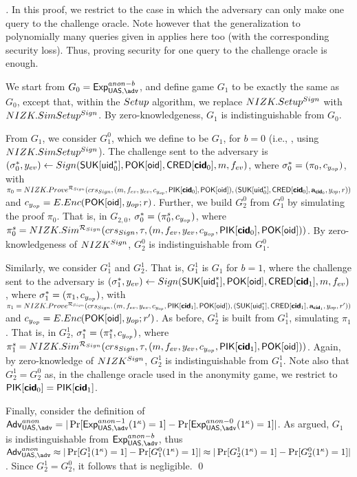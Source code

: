 \begin{proof}[]
  In this proof, we restrict to the case in which the adversary can only make
  one query to the challenge oracle. Note however that the generalization to
  polynomially many queries given in \cite{bsz05} applies here too (with the
  corresponding security loss). Thus, proving security for one query to the
  challenge oracle is enough.

  We start from $G_0=\ExpAnonb$, and define game $G_1$ to be exactly the same
  as $G_0$, except that, within the $Setup$ algorithm, we replace
  $NIZK.Setup^{Sign}$ with $NIZK.SimSetup^{Sign}$. By zero-knowledgeness,
  $G_1$ is indistinguishable from $G_0$.
  
  From $G_1$, we consider $G^0_1$, which we define to be $G_1$, for $b=0$
  (i.e., \ExpAnonz, using $NIZK.SimSetup^{Sign}$). The challenge sent to the
  adversary is $(\mathsf{\sigma}^*_0,y_{ev}) \gets Sign(\mathsf{S}\mathsf{UK}[\mathsf{uid}^*_0],\mathsf{P}\mathsf{OK}[\mathsf{oid}],
  \mathsf{CRED}[\boldsymbol{\mathsf{cid}}_0],m,f_{ev})$, where $\mathsf{\sigma}^*_0 = (\pi_0,c_{y_{op}})$, with
  $\pi_0 = NIZK.Prove^{\mathcal{R}_{Sign}}(crs_{Sign},(m,f_{ev},y_{ev},
  c_{y_{op}},\mathsf{P}\mathsf{IK}[\boldsymbol{\mathsf{cid}}_0],\mathsf{P}\mathsf{OK}[\mathsf{oid}]),(\mathsf{S}\mathsf{UK}[\mathsf{uid}^*_0],
  \mathsf{CRED}[\boldsymbol{\mathsf{cid}}_0],\mathbf{a}_{\boldsymbol{\mathsf{cid}}_0},y_{op},r))$ and $c_{y_{op}} =
  E.Enc(\mathsf{P}\mathsf{OK}[\mathsf{oid}],y_{op};r)$.
  Further, we build $G_2^0$ from $G_1^0$ by simulating the proof $\pi_0$. That
  is, in $G_{2,0}$, $\mathsf{\sigma}^*_0 = (\pi_0^s,c_{y_{op}})$, where $\pi^s_0 =
  NIZK.Sim^{\mathcal{R}_{Sign}}(crs_{Sign},\tau,(m,f_{ev},y_{ev},
  c_{y_{op}},\mathsf{P}\mathsf{IK}[\boldsymbol{\mathsf{cid}}_0],\mathsf{P}\mathsf{OK}[\mathsf{oid}]))$. By zero-knowledgeness
  of $NIZK^{Sign}$, $G_2^0$ is indistinguishable from $G_1^0$.

  Similarly, we consider $G_1^1$ and $G_2^1$. That is, $G_1^1$ is $G_1$
  for $b=1$, where the challenge
  sent to the adversary is $(\mathsf{\sigma}^*_1,y_{ev}) \gets Sign(\mathsf{S}\mathsf{UK}[\mathsf{uid}^*_1],
  \mathsf{P}\mathsf{OK}[\mathsf{oid}],\mathsf{CRED}[\boldsymbol{\mathsf{cid}}_1],m,f_{ev})$, where $\mathsf{\sigma}^*_1 = (\pi_1,
  c_{y_{op}})$, with $\pi_1 = NIZK.Prove^{\mathcal{R}_{Sign}}(crs_{Sign},
  (m,f_{ev},y_{ev},c_{y_{op}},\mathsf{P}\mathsf{IK}[\boldsymbol{\mathsf{cid}}_1],\mathsf{P}\mathsf{OK}[\mathsf{oid}]),
  (\mathsf{S}\mathsf{UK}[\mathsf{uid}^*_1],\mathsf{CRED}[\boldsymbol{\mathsf{cid}}_1],\mathbf{a}_{\boldsymbol{\mathsf{cid}}_1},y_{op},r'))$ and $c_{y_{op}}
  = E.Enc(\mathsf{P}\mathsf{OK}[\mathsf{oid}],y_{op};r')$. As before, $G_2^1$ is built from $G_1^1$,
  simulating $\pi_1$. That is, in $G_2^1$, $\mathsf{\sigma}^*_1 = (\pi_1^s,c_{y_{op}})$,
  where $\pi^s_1 = NIZK.Sim^{\mathcal{R}_{Sign}}(crs_{Sign},\tau,(m,
  f_{ev},y_{ev},c_{y_{op}},\mathsf{P}\mathsf{IK}[\boldsymbol{\mathsf{cid}}_1],\mathsf{P}\mathsf{OK}[\mathsf{oid}]))$. Again, by
  zero-knowledge of $NIZK^{Sign}$, $G_2^1$ is indistinguishable from $G_1^1$.
  Note also that $G_2^1=G_2^0$ as, in the challenge oracle used in the
  anonymity game, we restrict to $\mathsf{P}\mathsf{IK}[\boldsymbol{\mathsf{cid}}_0] = \mathsf{P}\mathsf{IK}[\boldsymbol{\mathsf{cid}}_1]$.

  Finally, consider the definition of $\AdvAnon=|\Pr\lbrack
  \ExpAnono(1^\secpar)=1\rbrack-\Pr\lbrack\ExpAnonz(1^\secpar)=1\rbrack|$. As
  argued, $G_1$ is indistinguishable from $\ExpAnonb$, thus
  $\AdvAnon \approx |\Pr\lbrack G_1^1(1^\secpar)=1\rbrack-\Pr\lbrack
  G_1^0(1^\secpar)=1\rbrack| \approx
  |\Pr\lbrack G_2^1(1^\secpar)=1\rbrack-\Pr\lbrack
  G_2^0(1^\secpar)=1\rbrack|$. Since $G_2^1=G_2^0$, it follows that
  \AdvAnon is negligible.
  \qed
\end{proof}

